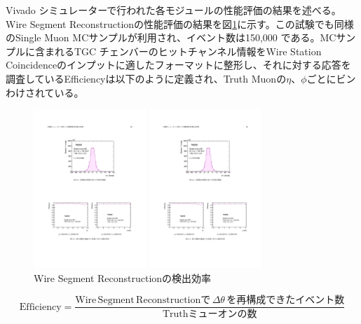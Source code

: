 Vivado シミュレーターで行われた各モジュールの性能評価の結果を述べる。Wire Segment Reconstructionの性能評価の結果を図\ref{Vivado_Wire_Efficiency}に示す。この試験でも同様のSingle Muon MCサンプルが利用され、イベント数は150,000 である。MCサンプルに含まれるTGC チェンバーのヒットチャンネル情報をWire Station Coincidenceのインプットに適したフォーマットに整形し、それに対する応答を調査しているEfficiencyは以下のように定義され、Truth Muonの$\eta$、$\phi$ごとにビンわけされている。

\begin{figure}
\begin{minipage}[b]{.5\linewidth}
\centering
\includegraphics[height=6cm]{fig/Test/Vivado_Wire_eta.pdf}
\end{minipage}%
\begin{minipage}[b]{.5\linewidth}
\centering
\includegraphics[height=6cm]{fig/Test/Vivado_Wire_phi.pdf}
\end{minipage}%
\caption[Wire Segment Reconstructionの検出効率]{Wire Segment Reconstructionの検出効率\cite{mt_nabeyama}}
\label{Vivado_Wire_Efficiency}
\end{figure}

\begin{equation}
\mathrm{Efficiency} = \frac{\mathrm{Wire \,Segment \,Reconstructionで}\,\Delta\theta\,\mathrm{を再構成できたイベント数}}{\mathrm{Truth ミューオン の数}}
\end{equation}



